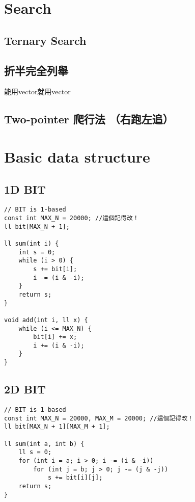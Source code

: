 \documentclass[10pt,oneside]{article}
\begin{document}
\begin{landscape}
\begin{multicols}{2}

\section{Search}

\subsection{Ternary Search}

\subsection{折半完全列舉}

能用vector就用vector

\subsection{Two-pointer 爬行法 （右跑左追）}


\section{Basic data structure}

\subsection{1D BIT}

\begin{lstlisting}
// BIT is 1-based
const int MAX_N = 20000; //這個記得改！
ll bit[MAX_N + 1];

ll sum(int i) {
    int s = 0;
    while (i > 0) {
        s += bit[i];
        i -= (i & -i);
    }
    return s;
}

void add(int i, ll x) {
    while (i <= MAX_N) {
        bit[i] += x;
        i += (i & -i);
    }
}
\end{lstlisting}

\subsection{2D BIT}

\begin{lstlisting}
// BIT is 1-based
const int MAX_N = 20000, MAX_M = 20000; //這個記得改！
ll bit[MAX_N + 1][MAX_M + 1];

ll sum(int a, int b) {
    ll s = 0;
    for (int i = a; i > 0; i -= (i & -i))
        for (int j = b; j > 0; j -= (j & -j))
            s += bit[i][j];
    return s;
}


\end{lstlisting}
\end{multicols}
\end{landscape}
\end{document}
